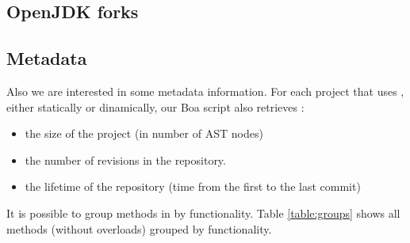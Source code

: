 \subsection{OpenJDK forks}


\subsection{Metadata}

Also we are interested in some metadata information.
For each project that uses \smu{}, either statically or dinamically, our Boa script also retrieves :
\begin{itemize}
\item the size of the project (in number of AST nodes)
\item the number of revisions in the repository.
\item the lifetime of the repository (time from the first to the last commit)
\end{itemize}

It is possible to group methods in \smu{} by functionality.
Table \ref{table:groups} shows all methods (without overloads) grouped by functionality.


